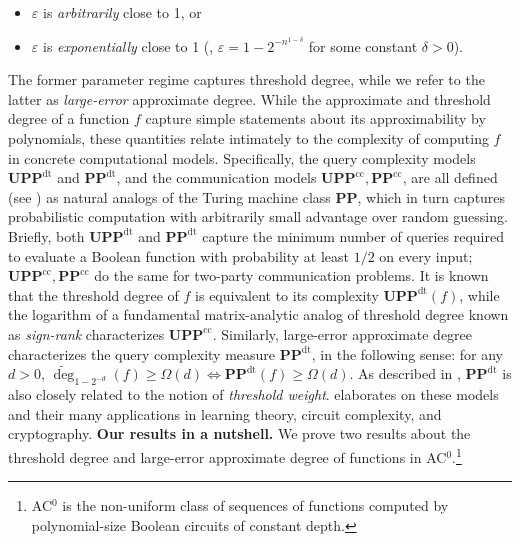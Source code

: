 \documentclass{toc}
\newcommand{\PP}{\mathbf{PP}}
\newcommand{\UPP}{\mathbf{UPP}}
\newcommand{\eps}{\varepsilon}
\newcommand{\adeg}{\widetilde{\operatorname{deg}}}
\begin{document}
\begin{itemize}
	\item  $\eps$ is \emph{arbitrarily} close to 1, or
	\item $\eps$ is \emph{exponentially} close to 1 (\ie, $\eps=1-2^{-n^{1-\delta}}$ 
	for some constant $\delta > 0$).
\end{itemize}
The former parameter regime captures threshold degree, while we refer to the latter as  \emph{large-error}
approximate degree.
%
While the approximate and threshold degree of a function $f$ capture simple statements about its approximability by polynomials, these quantities relate intimately to the complexity of computing $f$ in concrete computational models. Specifically, the query complexity models $\UPP^{\text{dt}}$ and $\PP^{\text{dt}}$, and the communication models $\UPP^{\text{cc}}, \PP^{\text{cc}}$, are all defined (see ) as natural analogs of the Turing machine class $\PP$, which in turn captures probabilistic computation with arbitrarily small advantage over random guessing. Briefly, both $\UPP^{\text{dt}}$ and $\PP^{\text{dt}}$ capture the minimum number of queries required to evaluate a Boolean function with probability at least $1/2$ on every input;  $\UPP^{\text{cc}}, \PP^{\text{cc}}$ do the same for two-party communication problems.
It is known that the threshold degree of $f$ is equivalent to its complexity $\UPP^{\text{dt}}(f)$, while the logarithm of a fundamental matrix-analytic analog of threshold degree known as \emph{sign-rank} characterizes $\UPP^{\text{cc}}$. \label{s1}
Similarly, large-error approximate degree characterizes the query complexity measure $\PP^{\text{dt}}$, in the following 
sense: for any $d > 0$, $\adeg_{1-2^{-d}}(f) \geq \Omega(d) \Longleftrightarrow \PP^{\text{dt}}(f) \geq \Omega(d)$. As described in , $\PP^{\text{dt}}$ is also closely related to the notion of \emph{threshold weight}. 
 elaborates on these models and their many applications in learning theory, circuit complexity, and cryptography.
\medskip \noindent \textbf{Our results in a nutshell.}
We prove two results about the threshold degree and large-error approximate degree
of functions in AC$^0$.\footnote{AC$^0$ is the non-uniform class of sequences of functions computed by polynomial-size %
Boolean circuits of constant depth.} 
\end{document}
